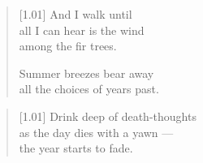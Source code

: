   \begin{verse}[1.01\textwidth]
    And I walk until\\
    all I can hear is the wind\\
    among the fir trees.

    \vin Summer breezes bear away\\
    \vin all the choices of years past.
  \end{verse}

  \begin{verse}[1.01\textwidth]
      Drink deep of death-thoughts\\
      as the day dies with a yawn ---\\
      the year starts to fade.
  \end{verse}
